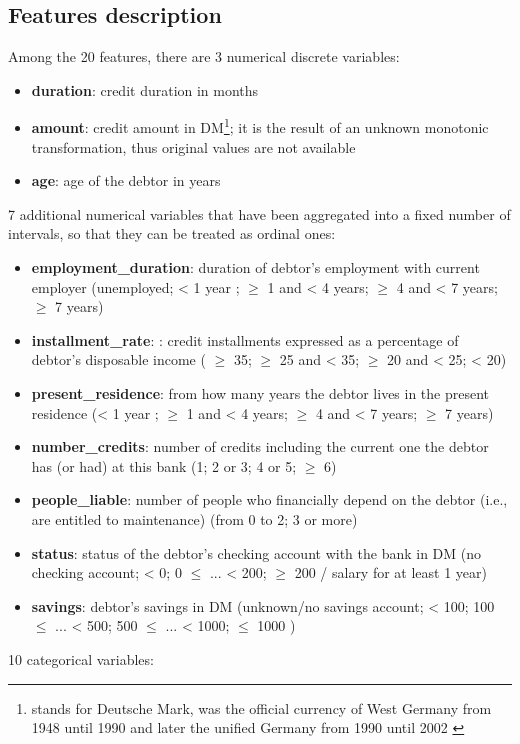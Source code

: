 \documentclass[letterpaper]{article}
\begin{document}
	\subsection{Features description}
	Among the 20 features, there are 3 numerical discrete variables:
	\begin{itemize}
		\item \textbf{duration}: credit duration in months
		\item \textbf{amount}: credit amount in DM\footnote{stands for Deutsche Mark, was the official currency of West Germany from 1948 until 1990 and later the unified Germany from 1990 until 2002 \cite{dm}}; it is the result of an unknown monotonic transformation, thus original values are not available
		\item \textbf{age}: age of the debtor in years
	\end{itemize}
	7 additional numerical variables that have been aggregated into a fixed number of intervals, so that they can be treated as ordinal ones:
	\begin{itemize}
		\item \textbf{employment\_duration}:  duration of debtor’s employment with current employer (unemployed; < 1 year ; $\geq$ 1 and < 4 years; $\geq$ 4 and < 7 years; $\geq$ 7 years)
		\item \textbf{installment\_rate}: : credit installments expressed as a percentage of debtor’s disposable income ( $\geq$ 35; $\geq$ 25 and < 35; $\geq$ 20 and < 25; < 20)
		\item \textbf{present\_residence}: from how many years the debtor lives in the present residence (< 1 year ; $\geq$ 1 and < 4 years; $\geq$ 4 and < 7 years; $\geq$ 7 years)
		\item \textbf{number\_credits}:  number of credits including the current one the debtor has (or had) at this bank (1; 2 or 3; 4 or 5; $\geq$ 6)
		\item \textbf{people\_liable}: number of people who financially depend on the debtor (i.e., are entitled to maintenance) (from 0 to 2; 3 or more)
		\item \textbf{status}: status of the debtor’s checking account with the bank in DM (no checking account; < 0; 0 $\leq$ ... < 200; $\geq$ 200 / salary for at least 1 year)
		\item \textbf{savings}: debtor’s savings in DM (unknown/no savings account; <  100; 100 $\leq$ ... <  500; 500 $\leq$ ... < 1000; $\leq$ 1000 )
	\end{itemize}
	10 categorical variables:
\end{document}
